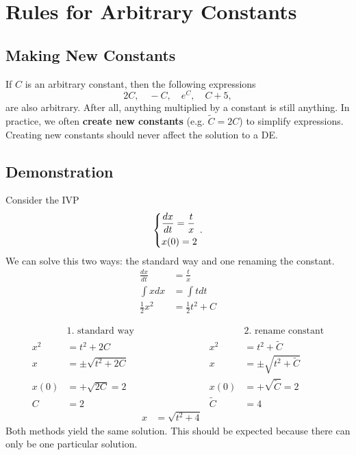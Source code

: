 \documentclass[09pt,letterpaper]{article}
\begin{document}
\section{Rules for Arbitrary Constants}

\subsection{Making New Constants}
If $C$ is an arbitrary constant, then the following expressions
\[
2C, \quad -C, \quad e^C, \quad C+5, 
\]
are also arbitrary. After all, anything multiplied by a constant is still anything. In practice, we often \textbf{create new constants} (e.g. $\tilde{C}=2C$) to simplify expressions. Creating new constants should never affect the solution to a DE.

\subsection{Demonstration}
Consider the IVP
$$
\begin{dcases}
    \frac{dx}{dt}=\frac{t}{x}\\
    x(0)= 2
\end{dcases}.
$$
We can solve this two ways: the standard way and one renaming the constant.
\begin{align*}
    && \frac{dx}{dt}&=\frac{t}{x}  && \\
    &&\int xdx&=\int tdt &&\\
    &&\frac{1}{2}x^2&=\frac{1}{2}t^2+C &&
\end{align*}

\begin{align*}
    &\text{1. standard way} && &  &\text{2. rename constant} \\
    x^2&=t^2+2C && &  x^2&=t^2+\tilde{C} \\
    x&=\pm\sqrt{t^2+2C} && &  x&=\pm\sqrt{t^2+\tilde{C}} \\
    x(0)&=+\sqrt{2C}=2 && &  x(0)&=+\sqrt{\tilde{C}}=2 \\
    C&=2 && &  \tilde{C}&=4 \\
    && x&=\sqrt{t^2+4}  && 
\end{align*}
Both methods yield the same solution. This should be expected because there can only be one particular solution. 
\end{document}
